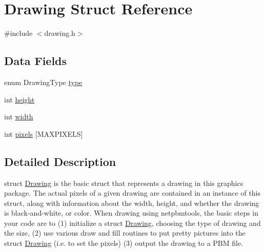 \hypertarget{structDrawing}{
\section{Drawing Struct Reference}
\label{structDrawing}
}


{\ttfamily \#include $<$drawing.h$>$}\subsection*{Data Fields}
\begin{DoxyCompactItemize}
\item 
enum DrawingType \hyperlink{structDrawing_a8539b73be2fc3239987909ae1eff6af2}{type}
\item 
int \hyperlink{structDrawing_abcce8d1fcf1e398497649243d6696dbf}{height}
\item 
int \hyperlink{structDrawing_a1844c9959ca62a84c9984f62aa9653b0}{width}
\item 
int \hyperlink{structDrawing_a500b2aecb1926c0ac81072b65f960f91}{pixels} \mbox{[}MAXPIXELS\mbox{]}
\end{DoxyCompactItemize}


\subsection{Detailed Description}
struct \hyperlink{structDrawing}{Drawing} is the basic struct that represents a drawing in this graphics package. The actual pixels of a given drawing are contained in an instance of this struct, along with information about the width, height, and whether the drawing is black-\/and-\/white, or color. When drawing using netpbmtools, the basic steps in your code are to (1) initialize a struct \hyperlink{structDrawing}{Drawing}, choosing the type of drawing and the size, (2) use various draw and fill routines to put pretty pictures into the struct \hyperlink{structDrawing}{Drawing} (i.e. to set the pixels) (3) output the drawing to a PBM file. 

